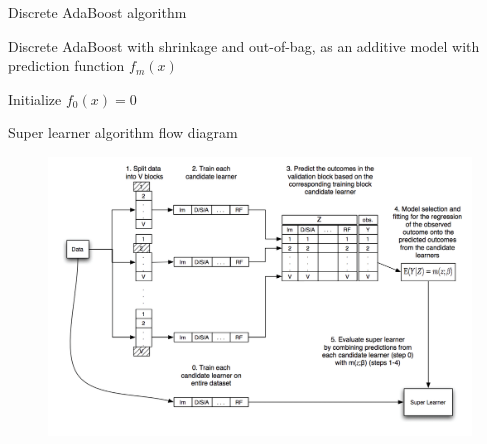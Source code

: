 
\begin{frame}[fragile]{Discrete AdaBoost algorithm}

Discrete AdaBoost with shrinkage and out-of-bag, as an additive model with prediction function $f_m(x)$

{%
\setlength{\interspacetitleruled}{0pt}%
\setlength{\algotitleheightrule}{0pt}%
\begin{algorithm}[H]
Initialize $f_0(x)=0$\;
\end{algorithm}}

\end{frame}


\begin{frame}{Super learner algorithm flow diagram}

\begin{figure}
	\includegraphics[width=\textwidth]{./Figures/sup-learn.jpg}
\end{figure}

\end{frame}

